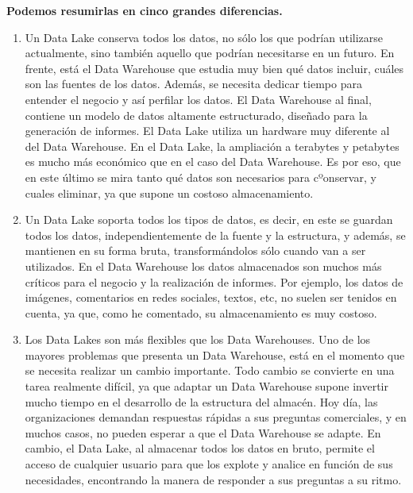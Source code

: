 \documentclass{article} %
\begin{document}
\noindent \textbf{}

\noindent \textbf{Podemos resumirlas en cinco grandes diferencias.}

\noindent \textbf{}

\begin{enumerate}
\item \textbf{ }Un Data Lake conserva todos los datos, no s\'{o}lo los que podr\'{i}an utilizarse actualmente, sino tambi\'{e}n aquello que podr\'{i}an necesitarse en un futuro. En frente, est\'{a} el Data Warehouse que estudia muy bien qu\'{e} datos incluir, cu\'{a}les son las fuentes de los datos. Adem\'{a}s, se necesita dedicar tiempo para entender el negocio y as\'{i} perfilar los datos. El Data Warehouse al final, contiene un modelo de datos altamente estructurado, dise\~{n}ado para la generaci\'{o}n de informes. El Data Lake utiliza un hardware muy diferente al del Data Warehouse. En el Data Lake, la ampliaci\'{o}n a terabytes y petabytes es mucho m\'{a}s econ\'{o}mico que en el caso del Data Warehouse. Es por eso, que en este \'{u}ltimo se mira tanto qu\'{e} datos son necesarios para cºonservar, y cuales eliminar, ya que supone un costoso almacenamiento.

\item  Un Data Lake soporta todos los tipos de datos, es decir, en este se guardan todos los datos, independientemente de la fuente y la estructura, y adem\'{a}s, se mantienen en su forma bruta, transform\'{a}ndolos s\'{o}lo cuando van a ser utilizados. En el Data Warehouse los datos almacenados son muchos m\'{a}s cr\'{i}ticos para el negocio y la realizaci\'{o}n de informes. Por ejemplo, los datos de im\'{a}genes, comentarios en redes sociales, textos, etc, no suelen ser tenidos en cuenta, ya que, como he comentado, su almacenamiento es muy costoso.

\item  Los Data Lakes son m\'{a}s flexibles que los Data Warehouses. Uno de los mayores problemas que presenta un Data Warehouse, est\'{a} en el momento que se necesita realizar un cambio importante. Todo cambio se convierte en una tarea realmente dif\'{i}cil, ya que adaptar un Data Warehouse supone invertir mucho tiempo en el desarrollo de la estructura del almac\'{e}n. Hoy d\'{i}a, las organizaciones demandan respuestas r\'{a}pidas a sus preguntas comerciales, y en muchos casos, no pueden esperar a que el Data Warehouse se adapte. En cambio, el Data Lake, al almacenar todos los datos en bruto, permite el acceso de cualquier usuario para que los explote y analice en funci\'{o}n de sus necesidades, encontrando la manera de responder a sus preguntas a su ritmo.


\end{enumerate}
\end{document}
